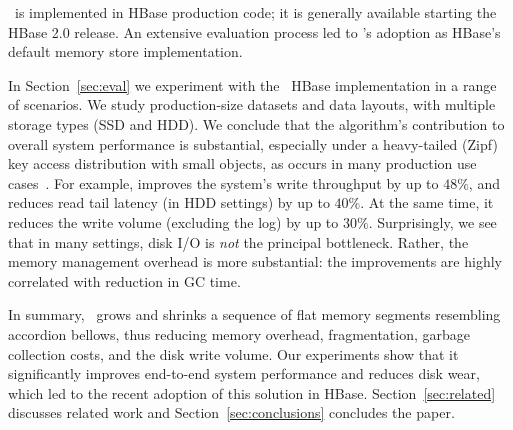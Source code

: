  

\sys\ is implemented in HBase production code; it is generally available starting the HBase 2.0 release. 
An extensive evaluation process led to \sys's adoption as HBase's default memory store implementation. 

In Section~\ref{sec:eval} we experiment with the \sys\ HBase implementation in a range of scenarios.
We study production-size datasets and data layouts, with multiple storage types (SSD and HDD). 
We conclude that the algorithm's contribution to overall system performance is substantial, 
especially under a  heavy-tailed (Zipf) key access distribution with 
small objects, as occurs in many production use cases~\cite{Wu2015}. For example, \sys\/ 
improves the system's write throughput by up to $48\%$, and reduces read tail latency 
(in HDD settings)  
by up to $40\%$. At the same time, it reduces the write volume (excluding the log) by up to $30\%$. Surprisingly, we see 
that in many settings, disk I/O is \emph{not} the principal bottleneck. Rather, the memory management 
overhead is more substantial: the improvements are highly correlated with  reduction in GC time. 

In summary, \sys\ grows and shrinks a sequence of flat memory segments resembling accordion bellows, 
thus reducing memory overhead, fragmentation, garbage collection costs, and the disk write volume. 
Our experiments show that it significantly improves end-to-end system performance and reduces disk wear, 
which led to the recent adoption of this solution in HBase. Section~\ref{sec:related} discusses related work 
and Section~\ref{sec:conclusions} concludes the paper.

